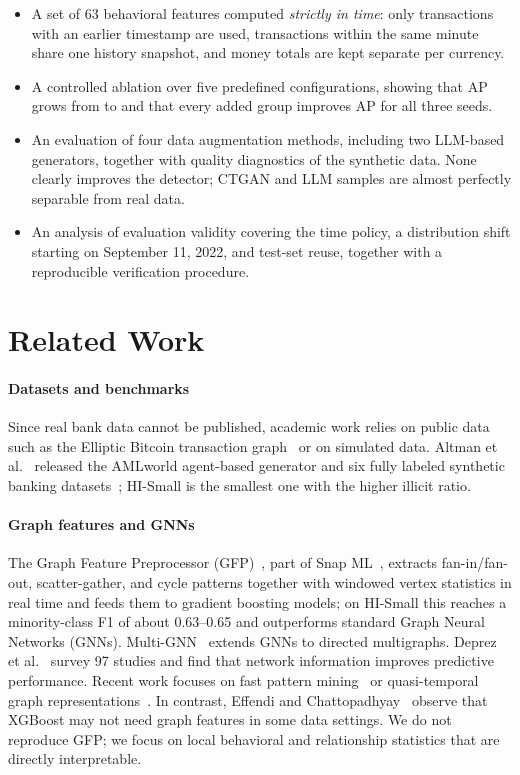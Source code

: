 \documentclass[sigconf,nonacm]{acmart}
\begin{document}
\begin{itemize}
  \item A set of 63 behavioral features computed \emph{strictly in time}: only transactions with an earlier timestamp
  are used, transactions within the same minute share one history snapshot, and money totals are kept separate per
  currency.
  \item A controlled ablation over five predefined configurations, showing that AP grows from \FZeroAP{} to
  \FFourAP{} and that every added group improves AP for all three seeds.
  \item An evaluation of four data augmentation methods, including two LLM-based generators, together with quality
  diagnostics of the synthetic data. None clearly improves the detector; CTGAN and LLM samples are almost perfectly
  separable from real data.
  \item An analysis of evaluation validity covering the time policy, a distribution shift starting on September 11,
  2022, and test-set reuse, together with a reproducible verification procedure.
\end{itemize}

\section{Related Work}

\paragraph{Datasets and benchmarks} Since real bank data cannot be published, academic work relies on public data
such as the Elliptic Bitcoin transaction graph~\cite{weber2019elliptic} or on simulated data. Altman et
al.~\cite{altman2023realistic} released the AMLworld agent-based generator and six fully labeled synthetic banking
datasets~\cite{ibmamlkaggle}; HI-Small is the smallest one with the higher illicit ratio.

\paragraph{Graph features and GNNs} The Graph Feature Preprocessor (GFP)~\cite{blanusa2024gfp}, part of Snap
ML~\cite{dunner2018snapml}, extracts fan-in/fan-out, scatter-gather, and cycle patterns together with windowed
vertex statistics in real time and feeds them to gradient boosting models; on HI-Small this reaches a
minority-class F1 of about 0.63--0.65 and outperforms standard Graph Neural Networks (GNNs).
Multi-GNN~\cite{egressy2024multignn} extends GNNs to directed multigraphs. Deprez et al.~\cite{deprez2024network}
survey 97 studies and find that network information improves predictive performance. Recent work focuses on fast
pattern mining~\cite{ye2026blazingaml} or quasi-temporal graph representations~\cite{tariq2026exstraqt}. In contrast,
Effendi and Chattopadhyay~\cite{effendi2024fhe} observe that XGBoost may not need graph features in some data
settings. We do not reproduce GFP; we focus on local behavioral and relationship statistics that are directly
interpretable.
\end{document}
